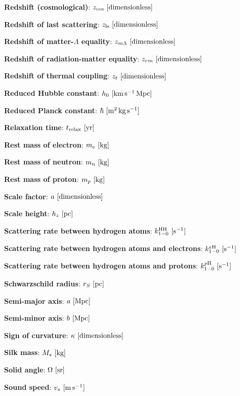 \documentclass[a4paper,11pt]{article}
\begin{document}
{\noindent}\textbf{Redshift (cosmological)}: $z_\mathrm{cos} ~ [{\rm dimensionless}]$

{\noindent}\textbf{Redshift of last scattering}: $z_\mathrm{ls} ~ [{\rm dimensionless}]$

{\noindent}\textbf{Redshift of matter-$\Lambda$ equality}: $z_{m\Lambda} ~ [{\rm dimensionless}]$

{\noindent}\textbf{Redshift of radiation-matter equality}: $z_{rm} ~ [{\rm dimensionless}]$

{\noindent}\textbf{Redshift of thermal coupling}: $z_t ~ [{\rm dimensionless}]$

{\noindent}\textbf{Reduced Hubble constant}: $h_0 ~ [{\rm km\,s^{-1}\,Mpc}]$

{\noindent}\textbf{Reduced Planck constant}: $\hbar ~ [{\rm m^2\,kg\,s^{-1}}]$

{\noindent}\textbf{Relaxation time}: $t_\mathrm{relax} ~ [{\rm yr}]$

{\noindent}\textbf{Rest mass of electron}: $m_e ~ [{\rm kg}]$

{\noindent}\textbf{Rest mass of neutron}: $m_n ~ [{\rm kg}]$

{\noindent}\textbf{Rest mass of proton}: $m_p ~ [{\rm kg}]$

{\noindent}\textbf{Scale factor}: $a ~ [{\rm dimensionless}]$

{\noindent}\textbf{Scale height}: $h_z ~ [{\rm pc}]$

{\noindent}\textbf{Scattering rate between hydrogen atoms}: $k_{1-0}^\mathrm{HH} ~ [{\rm s^{-1}}]$

{\noindent}\textbf{Scattering rate between hydrogen atoms and electrons}: $k_{1-0}^{e\mathrm{H}} ~ [{\rm s^{-1}}]$

{\noindent}\textbf{Scattering rate between hydrogen atoms and protons}: $k_{1-0}^{p\mathrm{H}} ~ [{\rm s^{-1}}]$

{\noindent}\textbf{Schwarzschild radius}: $r_S ~ [{\rm pc}]$

{\noindent}\textbf{Semi-major axis}: $a ~ [{\rm Mpc}]$

{\noindent}\textbf{Semi-minor axis}: $b ~ [{\rm Mpc}]$

{\noindent}\textbf{Sign of curvature}: $\kappa ~ [{\rm dimensionless}]$

{\noindent}\textbf{Silk mass}: $M_s ~ [{\rm kg}]$

{\noindent}\textbf{Solid angle}: $\Omega ~ [{\rm sr}]$

{\noindent}\textbf{Sound speed}: $v_s ~ [{\rm m\,s^{-1}}]$
\end{document}
